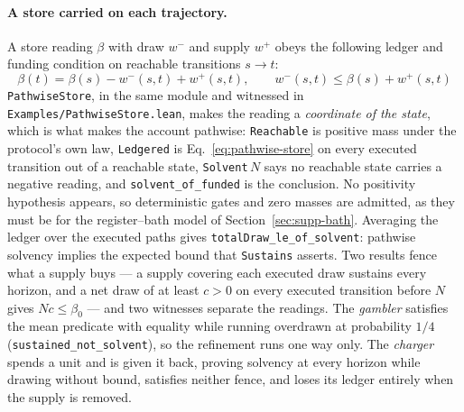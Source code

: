 \documentclass{article}
\begin{document}
\paragraph{A store carried on each trajectory.}
A store reading $\beta$ with draw $w^-$ and supply $w^+$ obeys the following ledger and funding condition on reachable transitions $s\to t$:
\begin{equation}
 \beta(t)=\beta(s)-w^-(s,t)+w^+(s,t),\qquad w^-(s,t)\leq\beta(s)+w^+(s,t)
 \label{eq:pathwise-store}
\end{equation}
\nolinkurl{PathwiseStore}, in the same module and witnessed in
\nolinkurl{Examples/PathwiseStore.lean}, makes the reading
a \emph{coordinate of the state}, which is what makes the account pathwise:
\texttt{Reachable} is positive mass under the protocol's own law,
\texttt{Ledgered} is Eq.~\eqref{eq:pathwise-store} on every executed transition
out of a reachable state, \texttt{Solvent}$\,N$ says no reachable state carries
a negative reading, and \nolinkurl{solvent_of_funded} is
the conclusion. No positivity hypothesis appears, so deterministic gates and
zero masses are admitted, as they must be for the register--bath model of
Section~\ref{sec:supp-bath}. Averaging the ledger over the executed paths gives
\nolinkurl{totalDraw_le_of_solvent}:
pathwise solvency implies the expected bound that \texttt{Sustains} asserts. Two
results fence what a supply buys --- a supply covering each executed draw
sustains every horizon, and a net draw of at least $c>0$ on every executed
transition before $N$ gives $Nc\leq\beta_0$ --- and two witnesses separate the
readings. The \emph{gambler} satisfies the mean predicate with equality while
running overdrawn at probability $1/4$
(\nolinkurl{sustained_not_solvent}), so the refinement
runs one way only. The \emph{charger} spends a unit and is given it back,
proving solvency at every horizon while drawing without bound, satisfies
neither fence, and loses its ledger entirely when the supply is removed.
\end{document}
